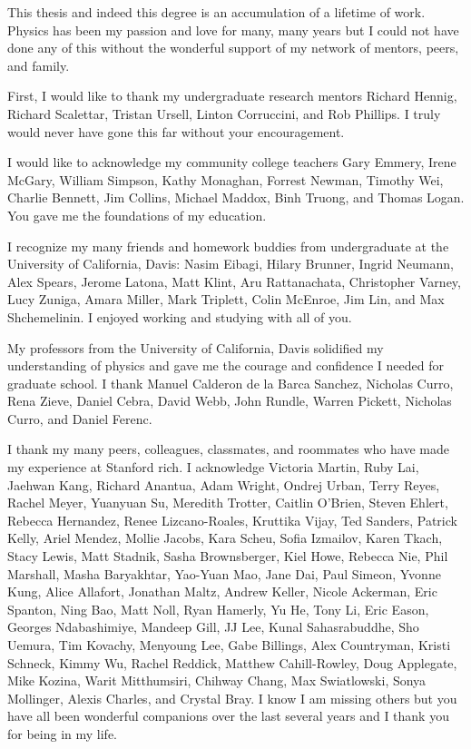 
This thesis and indeed this degree 
is an accumulation of a lifetime 
of work.  Physics has been my passion and love for
many, many years but I could not have done any of this without
the wonderful support of my network of mentors, peers, and family.

First, I would like to thank my undergraduate research mentors
Richard Hennig, Richard Scalettar, Tristan Ursell, Linton Corruccini,
and Rob Phillips.
I truly would never have gone this far without your encouragement.

I would like to acknowledge my community college teachers 
Gary Emmery, Irene McGary, William Simpson, Kathy Monaghan, Forrest Newman,
Timothy Wei, Charlie Bennett, Jim Collins, Michael Maddox, Binh Truong, and Thomas Logan.
You gave me the foundations of my education.

I recognize my many friends and homework buddies from undergraduate at the University of California, Davis:
Nasim Eibagi, Hilary Brunner, Ingrid Neumann, 
Alex Spears, Jerome Latona, Matt Klint, Aru Rattanachata,
Christopher Varney, Lucy Zuniga, Amara Miller, Mark Triplett,
Colin McEnroe, Jim Lin, and Max Shchemelinin.
I enjoyed working and studying with all of you.

My professors from the University of California, Davis solidified my 
understanding of physics and gave me the courage and confidence I needed for 
graduate school.  I thank Manuel Calderon de la Barca Sanchez, Nicholas Curro, Rena Zieve,
Daniel Cebra, David Webb, John Rundle, Warren Pickett, Nicholas Curro, and Daniel Ferenc. 

I thank my many peers, colleagues, classmates, and roommates who have made my experience 
at Stanford rich. I acknowledge
Victoria Martin, Ruby Lai, Jaehwan Kang, Richard Anantua,
Adam Wright, Ondrej Urban, Terry Reyes, Rachel Meyer, Yuanyuan Su,
Meredith Trotter, Caitlin O'Brien, Steven Ehlert, Rebecca Hernandez, Renee Lizcano-Roales, Kruttika Vijay,
Ted Sanders, Patrick Kelly, Ariel Mendez, Mollie Jacobs, Kara Scheu, Sofia Izmailov, Karen Tkach, Stacy Lewis,
Matt Stadnik, Sasha Brownsberger, Kiel Howe,
Rebecca Nie, Phil Marshall, Masha Baryakhtar, Yao-Yuan Mao, Jane Dai,
Paul Simeon, Yvonne Kung, Alice Allafort, Jonathan Maltz,
Andrew Keller, Nicole Ackerman, Eric Spanton, Ning Bao,  
Matt Noll, Ryan Hamerly, Yu He, Tony Li, Eric Eason,
Georges Ndabashimiye, Mandeep Gill, JJ Lee, Kunal Sahasrabuddhe,
Sho Uemura, Tim Kovachy, Menyoung Lee, Gabe Billings, Alex Countryman, Kristi Schneck,
Kimmy Wu, Rachel Reddick, Matthew Cahill-Rowley, Doug Applegate, Mike Kozina, Warit Mitthumsiri, Chihway Chang, 
Max Swiatlowski, Sonya Mollinger, Alexis Charles, and Crystal Bray.  
I know I am missing others but you have all been wonderful companions
over the last several years and I thank you for being in my life. 

